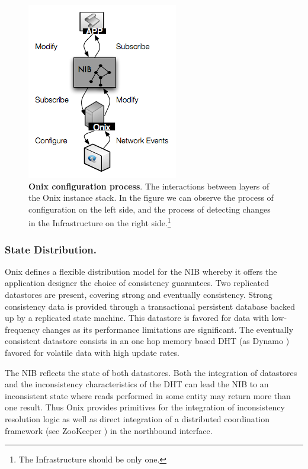 \documentclass[12pt,openright,twoside]{report}
\begin{document}
\begin{itemize}
\begin{figure}
  \centering 
  \includegraphics[scale=0.5]{pic/onix-process.png}
  \caption[Onix configuration process]{\textbf{Onix configuration
      process}. The interactions between layers of the Onix
    instance stack. In the figure we can observe the process of
    configuration on the left side, and the process of detecting
    changes in the Infrastructure on the right side.\footnote{The Infrastructure should be only one.}} 
  \label{fig:onix-process}
\end{figure}

\subsubsection{State Distribution.} Onix defines a flexible distribution model for the NIB 
whereby  it offers the application
designer the choice of consistency guarantees. Two
replicated datastores are present, covering  strong 
and  eventually consistency. Strong consistency data is
provided through a transactional persistent database backed up by a replicated
state machine. This datastore is
favored for data with low-frequency changes  as its performance limitations are
significant. The eventually consistent datastore consists in 
an one hop memory based DHT  (as Dynamo 
\cite{DeCandia:2007cn}) favored for  volatile data with high update
rates. 

The NIB reflects the state of both datastores. Both the integration of
datastores and the inconsistency  characteristics of the DHT can lead the
NIB to an inconsistent state where reads performed in some entity may
return more than one result. Thus Onix provides primitives
for the integration of inconsistency resolution logic as well as 
direct integration of a distributed
coordination framework (see  ZooKeeper \cite{Hunt:2010ux}) in the
northbound interface. 


\end{itemize}
\end{document}

